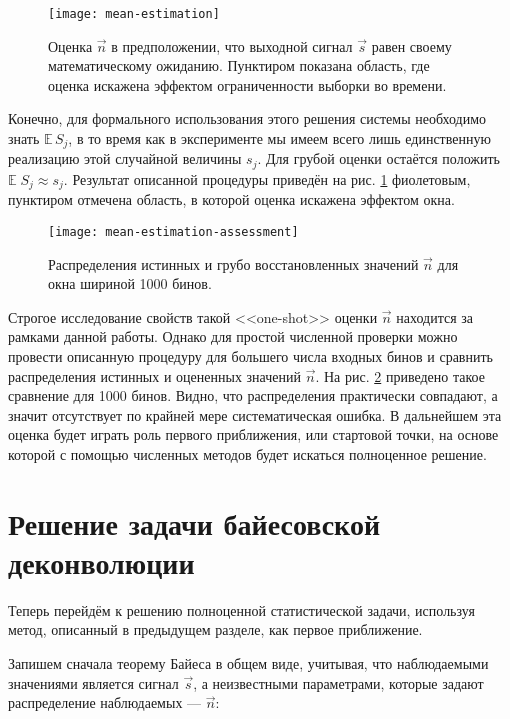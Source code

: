 \begin{figure}
	\centering
	\texttt{[image: mean-estimation]}
	\caption{Оценка $\vec{n}$ в предположении, что выходной сигнал $\vec{s}$ равен своему математическому ожиданию. Пунктиром показана область, где оценка искажена эффектом ограниченности выборки во времени.}
	\label{pic:mean-estimation}
\end{figure}

Конечно, для формального использования этого решения системы необходимо знать $\mathbb{E} \, S_j$, в то время как в эксперименте мы имеем всего лишь единственную реализацию этой случайной величины $s_j$. Для грубой оценки остаётся положить $\mathbb{E} \; S_j \approx s_j$. Результат описанной процедуры приведён на рис. \ref{pic:mean-estimation} фиолетовым, пунктиром отмечена область, в которой оценка искажена эффектом окна.

\begin{figure}
	\centering
	\texttt{[image: mean-estimation-assessment]}
	\caption{Распределения истинных и грубо восстановленных значений $\vec{n}$ для окна шириной 1000 бинов.}
	\label{pic:mean-estimation-assessment}
\end{figure}

Строгое исследование свойств такой <<one-shot>> оценки $\vec{n}$ находится за рамками данной работы. Однако для простой численной проверки можно провести описанную процедуру для большего числа входных бинов и сравнить распределения истинных и оцененных значений $\vec{n}$. На рис. \ref{pic:mean-estimation-assessment} приведено такое сравнение для 1000 бинов. Видно, что распределения практически совпадают, а значит отсутствует по крайней мере систематическая ошибка. В дальнейшем эта оценка будет играть роль первого приближения, или стартовой точки, на основе которой с помощью численных методов будет искаться полноценное решение.

\section{Решение задачи байесовской деконволюции}
\label{sec:bayesian-deconvolution-solution}

Теперь перейдём к решению полноценной статистической задачи, используя метод, описанный в предыдущем разделе, как первое приближение.

Запишем сначала теорему Байеса в общем виде, учитывая, что наблюдаемыми значениями является сигнал $\vec{s}$, а неизвестными параметрами, которые задают распределение наблюдаемых --- $\vec{n}$:

